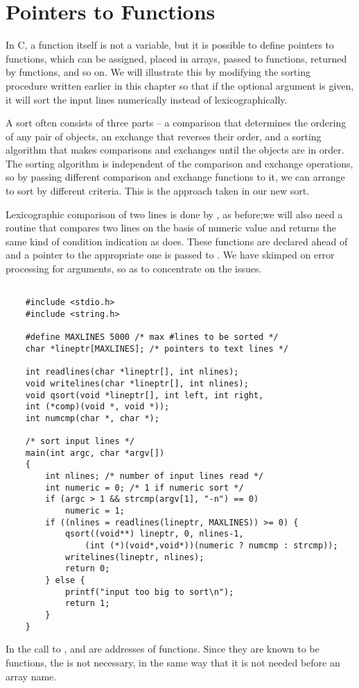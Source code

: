 \section{Pointers to Functions}


In C, a function itself is not a variable, but it is possible to define pointers to functions, which can be assigned, placed in arrays, passed to functions, returned by functions, and so on.
We will illustrate this by modifying the sorting procedure written earlier in this chapter so that if the optional argument  is given, it will sort the input lines numerically instead of lexicographically.

A sort often consists of three parts --
a comparison that determines the ordering of any pair of objects,
an exchange that reverses their order, and
a sorting algorithm that makes comparisons and exchanges until the objects are in order.
The sorting algorithm is independent of the comparison and exchange operations, so by passing different comparison and exchange functions to it, we can arrange to sort by different criteria.
This is the approach taken in our new sort.

Lexicographic comparison of two lines is done by , as before;we will also need a routine  that compares two lines on the basis of numeric value and returns the same kind of condition indication as  does.
These functions are declared ahead of  and a pointer to the appropriate one is passed to .
We have skimped on error processing for arguments, so as to concentrate on the  issues.

\begin{lstlisting}

    #include <stdio.h>
    #include <string.h>

    #define MAXLINES 5000 /* max #lines to be sorted */
    char *lineptr[MAXLINES]; /* pointers to text lines */

    int readlines(char *lineptr[], int nlines);
    void writelines(char *lineptr[], int nlines);
    void qsort(void *lineptr[], int left, int right,
    int (*comp)(void *, void *));
    int numcmp(char *, char *);

    /* sort input lines */
    main(int argc, char *argv[])
    {
        int nlines; /* number of input lines read */
        int numeric = 0; /* 1 if numeric sort */
        if (argc > 1 && strcmp(argv[1], "-n") == 0)
            numeric = 1;
        if ((nlines = readlines(lineptr, MAXLINES)) >= 0) {
            qsort((void**) lineptr, 0, nlines-1,
                (int (*)(void*,void*))(numeric ? numcmp : strcmp));
            writelines(lineptr, nlines);
            return 0;
        } else {
            printf("input too big to sort\n");
            return 1;
        }
    }

\end{lstlisting}
In the call to ,  and  are addresses of functions. Since they are known to be functions, the \code{\&} is not necessary, in the same way that it is not needed before an array name.

